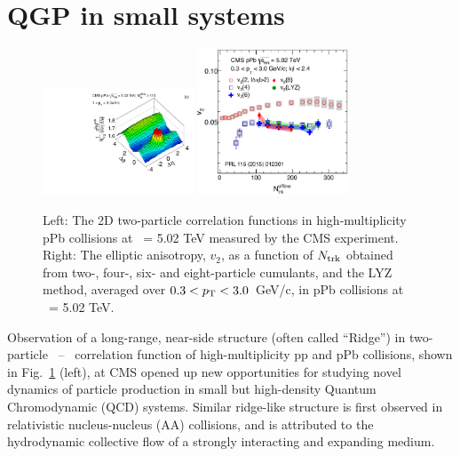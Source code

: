 \section{QGP in small systems}

\begin{figure}[thb]
  \begin{center}
    \includegraphics[width=0.4\textwidth]{figures/corr2D_pPb_N110_pt1-3_20121016.pdf}
    \includegraphics[width=0.4\textwidth]{figures/v2m_pPb.pdf}
    \caption{ Left: The 2D two-particle correlation functions in high-multiplicity 
    pPb collisions at \rootsNN\ = 5.02 TeV measured by the CMS experiment.
    Right: The elliptic anisotropy, $v_2$, as a function of $N_{\rm trk}$
    obtained from two-, four-, six- and eight-particle cumulants, and the LYZ method, 
    averaged over $0.3<p_\mathrm{T}<3.0$~GeV/c, in pPb collisions at \rootsNN\ = 5.02 TeV.
    }
    \label{fig:ridge_pPb}
  \end{center}
\end{figure} 

Observation of a long-range, near-side structure (often called ``Ridge'') in two-particle
\deta\ -- \dphi\ correlation function of high-multiplicity pp and pPb collisions, shown in Fig.~\ref{fig:ridge_pPb} 
(left), at CMS opened up new opportunities for studying novel dynamics of particle production 
in small but high-density Quantum Chromodynamic (QCD) systems. Similar ridge-like structure is
first observed in relativistic nucleus-nucleus (AA) collisions, and is attributed to the 
hydrodynamic collective flow of a strongly interacting and expanding medium. 


